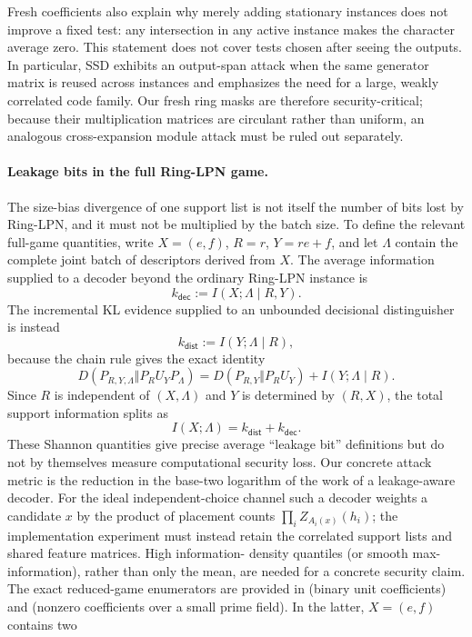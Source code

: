 Fresh coefficients also explain why merely adding stationary instances does
not improve a fixed test: any intersection in any active instance makes the
character average zero.  This statement does not cover tests chosen after
seeing the outputs.  In particular, SSD exhibits an output-span attack when
the same generator matrix is reused across instances and emphasizes the need
for a large, weakly correlated code family.  Our fresh ring masks are therefore
security-critical; because their multiplication matrices are circulant rather
than uniform, an analogous cross-expansion module attack must be ruled out
separately.

\paragraph{Leakage bits in the full Ring-LPN game.}
The size-bias divergence of one support list is not itself the number of bits
lost by Ring-LPN, and it must not be multiplied by the batch size.  To define
the relevant full-game quantities, write $X=(e,f)$, $R=r$, $Y=re+f$, and let
$\Lambda$ contain the complete joint batch of descriptors derived from $X$.
The average information supplied to a decoder beyond the ordinary Ring-LPN
instance is
\[
 k_{\mathsf{dec}}:=I(X;\Lambda\mid R,Y).
\]
The incremental KL evidence supplied to an unbounded decisional distinguisher
is instead
\[
 k_{\mathsf{dist}}:=I(Y;\Lambda\mid R),
\]
because the chain rule gives the exact identity
\[
 D(P_{R,Y,\Lambda}\Vert P_R U_Y P_\Lambda)
 =D(P_{R,Y}\Vert P_R U_Y)+I(Y;\Lambda\mid R).
\]
Since $R$ is independent of $(X,\Lambda)$ and $Y$ is determined by $(R,X)$,
the total support information splits as
\[
 I(X;\Lambda)=k_{\mathsf{dist}}+k_{\mathsf{dec}}.
\]
These Shannon quantities give precise average ``leakage bit'' definitions but
do not by themselves measure computational security loss.  Our concrete
attack metric is the reduction in the base-two logarithm of the work of a
leakage-aware decoder.  For the ideal independent-choice channel such a
decoder weights a candidate $x$ by the product of placement counts
$\prod_i Z_{A_i(x)}(h_i)$; the implementation experiment must instead retain
the correlated support lists and shared feature matrices.  High information-
density quantiles (or smooth max-information), rather than only the mean, are
needed for a concrete security claim.  The exact reduced-game enumerators are
provided in  (binary unit
coefficients) and  (nonzero
coefficients over a small prime field).  In the latter, $X=(e,f)$ contains two
